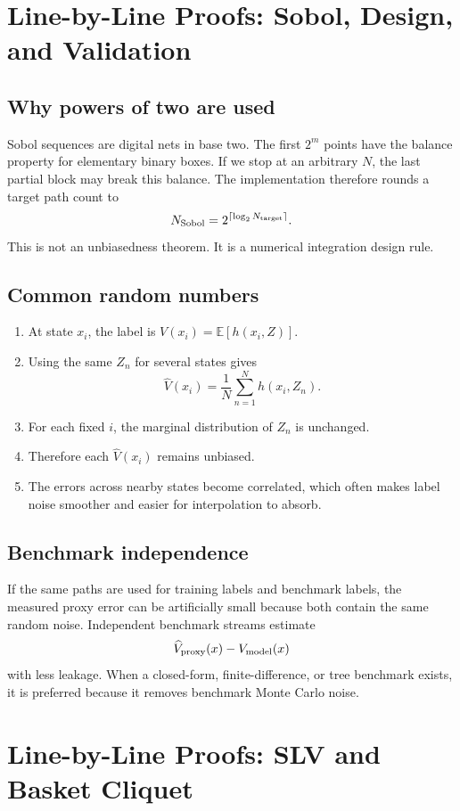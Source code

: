 \documentclass[11pt,oneside]{book}
\theoremstyle{definition}
\newenvironment{proofsteps}
{\begin{enumerate}[label=\textbf{Line \arabic*.}, itemsep=0.35em]}
{\end{enumerate}}
\newcommand{\E}{\mathbb{E}}
\begin{document}
\chapter{Line-by-Line Proofs: Sobol, Design, and Validation}

\section{Why powers of two are used}
Sobol sequences are digital nets in base two. The first \(2^m\) points have the balance property for elementary binary boxes. If we stop at an arbitrary \(N\), the last partial block may break this balance. The implementation therefore rounds a target path count to
\[
  N_{\rm Sobol}=2^{\lceil\log_2 N_{\rm target}\rceil}.
\]
This is not an unbiasedness theorem. It is a numerical integration design rule.

\section{Common random numbers}
\begin{proofsteps}
\item At state \(x_i\), the label is \(V(x_i)=\E[h(x_i,Z)]\).
\item Using the same \(Z_n\) for several states gives
\[
\widehat V(x_i)=\frac1N\sum_{n=1}^N h(x_i,Z_n).
\]
\item For each fixed \(i\), the marginal distribution of \(Z_n\) is unchanged.
\item Therefore each \(\widehat V(x_i)\) remains unbiased.
\item The errors across nearby states become correlated, which often makes label noise smoother and easier for interpolation to absorb.
\end{proofsteps}

\section{Benchmark independence}
If the same paths are used for training labels and benchmark labels, the measured proxy error can be artificially small because both contain the same random noise. Independent benchmark streams estimate
\[
  \widehat V_{\rm proxy}(x)-V_{\rm model}(x)
\]
with less leakage. When a closed-form, finite-difference, or tree benchmark exists, it is preferred because it removes benchmark Monte Carlo noise.

\chapter{Line-by-Line Proofs: SLV and Basket Cliquet}
\end{document}
